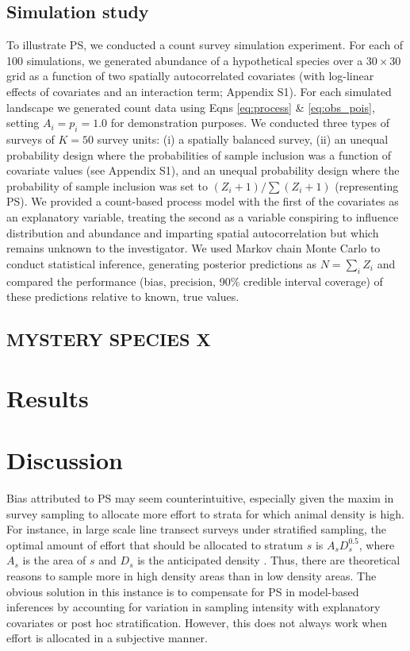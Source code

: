 \documentclass[times,mee,doublespace,]{besauth2}
\begin{document}
\subsection{Simulation study}

To illustrate PS, we conducted a count survey simulation experiment.  For each of 100 simulations, we generated abundance of a hypothetical species over a $30 \times 30$ grid as a function of two spatially autocorrelated covariates (with log-linear effects of covariates and an interaction term; Appendix S1).   For each simulated landscape we generated count data using Eqns \ref{eq:process} \& \ref{eq:obs_pois}, setting $A_i = p_i = 1.0$ for demonstration purposes.  We conducted three types of surveys of $K=50$ survey units: (i) a spatially balanced survey, (ii) an unequal probability design where the probabilities of sample inclusion was a function of covariate values (see Appendix S1), and an unequal probability design where the probability of sample inclusion was set to $(Z_i+1)/\sum(Z_i+1)$ (representing PS).  We provided a count-based process model with the first of the covariates as an explanatory variable, treating the second as a variable conspiring to influence distribution and abundance and imparting spatial autocorrelation but which remains unknown to the investigator. We used Markov chain Monte Carlo to conduct statistical inference, generating posterior predictions as $N = \sum_i Z_i$ and compared the performance (bias, precision, 90\% credible interval coverage) of these predictions relative to known, true values.

\subsection{MYSTERY SPECIES X}


\section{Results}

\section{Discussion}

Bias attributed to PS may seem counterintuitive, especially given the maxim in survey sampling to allocate more effort to strata for which animal density is high. For instance, in large scale line transect surveys under stratified sampling, the optimal amount of effort that should be allocated to stratum $s$ is $A_s D_s^{0.5}$, where $A_s$ is the area of $s$ and $D_s$ is the anticipated density \citep[][eqn 7.7]{BucklandEtAl2001}.  Thus, there are theoretical reasons to sample more in high density areas than in low density areas. The obvious solution in this instance is to compensate for PS in model-based inferences by accounting for variation in sampling intensity with explanatory covariates or post hoc stratification. However, this does not always work when effort is allocated in a subjective manner.
\end{document}
